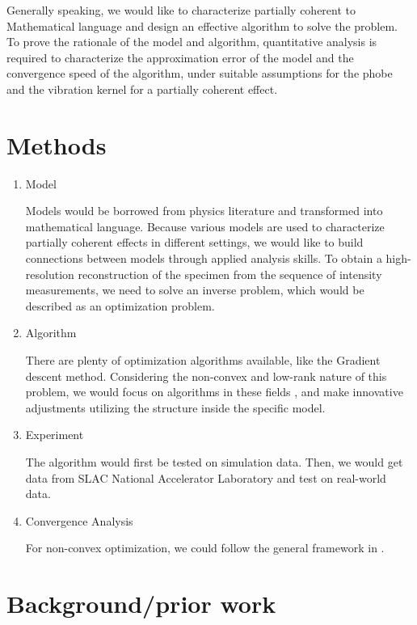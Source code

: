 \documentclass{article}
\numberwithin{equation}{section}
\begin{document}
Generally speaking, we would like to characterize partially coherent to Mathematical language and design an effective algorithm to solve the problem. To prove the rationale of the model and algorithm, quantitative analysis is required to characterize the approximation error of the model and the convergence speed of the algorithm, under suitable assumptions for the phobe and the vibration kernel for a partially coherent effect.





\section{Methods}
\begin{enumerate}[leftmargin=*]
\item Model

Models would be borrowed from physics literature and transformed into mathematical language. Because various models are used to characterize partially coherent effects in different settings, we would like to build connections between models through applied analysis skills. To obtain a high-resolution reconstruction of the specimen from the sequence of intensity measurements, we need to solve an inverse problem, which would be described as an optimization problem. 

\item Algorithm 

There are plenty of optimization algorithms available, like the Gradient descent method.
Considering the non-convex and low-rank nature of this problem, we would focus on algorithms in these fields \cite{lowrank}\cite{ADMM}, and make innovative adjustments utilizing the structure inside the specific model.

\item Experiment

The algorithm would first be tested on simulation data. Then, we would get data from SLAC National Accelerator Laboratory and test on real-world data.

\item Convergence Analysis

For non-convex optimization, we could follow the general framework in \cite{nonconvex}.



\end{enumerate}

\section{Background/prior work}
\end{document}

